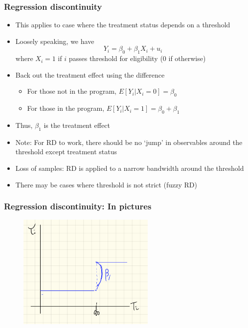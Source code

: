 \documentclass[aspectratio=169]{beamer}
\begin{document}
\begin{frame}
\frametitle{Regression discontinuity}
\begin{itemize}
\item This applies to case where the treatment status depends on a threshold
\item Loosely speaking, we have
\[
Y_i = \beta_0+\beta_1X_i+u_i
\]
where $X_i=1$ if $i$ passes threshold for eligibility (0 if otherwise)
\item Back out the treatment effect using the difference
\begin{itemize}
\item For those not in the program, $E[Y_i|X_i=0]=\beta_0$ 
\item For those in the program, $E[Y_i|X_i=1]=\beta_0+\beta_1$
\end{itemize}
\item Thus, $\beta_1$ is the treatment effect
\item Note: For RD to work, there should be no `jump' in observables around the threshold except treatment status
\item Loss of samples: RD is applied to a narrow bandwidth around the threshold
\item There may be cases where threshold is not strict (fuzzy RD)
\end{itemize}
\end{frame}

\begin{frame}
\frametitle{Regression discontinuity: In pictures}
\begin{figure}[H]
\includegraphics[width=0.6\textwidth, keepaspectratio]{fig2.png}
\end{figure}
\end{frame}
\end{document}

